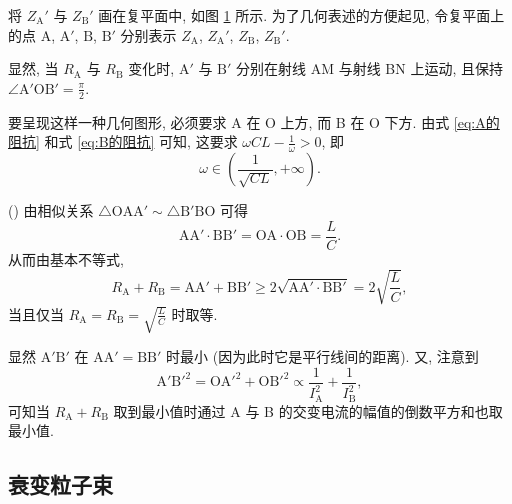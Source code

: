 \documentclass{article}
\newcounter{para}
\newcommand\mypara{\par\refstepcounter{para}(\thepara)\space}
\begin{document}
将 $Z_\mathrm A'$ 与 $Z_\mathrm B'$ 画在复平面中, 如图 \ref{fig:阻抗复平面} 所示.
为了几何表述的方便起见,
令复平面上的点 $\mathrm A$, $\mathrm A'$, $\mathrm B$, $\mathrm B'$
分别表示 $Z_\mathrm A$, $Z_\mathrm A'$, $Z_\mathrm B$, $Z_\mathrm B'$.

\begin{figure}[h!]
	\centering
	\caption{}
	\label{fig:阻抗复平面}
\end{figure}

显然, 当 $R_\mathrm A$ 与 $R_\mathrm B$ 变化时,
$\mathrm A'$ 与 $\mathrm B'$ 分别在射线 AM 与射线 BN 上运动,
且保持 $\angle\mathrm{A'OB'}=\frac\pi2$.

要呈现这样一种几何图形, 必须要求 A 在 O 上方, 而 B 在 O 下方.
由式 \ref{eq:A的阻抗} 和式 \ref{eq:B的阻抗} 可知, 这要求 $\omega CL-\frac1\omega>0$, 即
\begin{equation}
	\omega\in\left(\frac1{\sqrt{CL}},+\infty\right).
\end{equation}

\mypara
由相似关系 $\triangle\mathrm{OAA'}\sim\triangle\mathrm{B'BO}$ 可得
\begin{equation}
	\mathrm{AA'}\cdot\mathrm{BB'}=\mathrm{OA}\cdot\mathrm{OB}=\frac LC.
\end{equation}
从而由基本不等式,
\begin{equation}
	R_\mathrm A+R_\mathrm B=\mathrm{AA'}+\mathrm{BB'}\ge2\sqrt{\mathrm{AA'}\cdot\mathrm{BB'}}=2\sqrt{\frac LC},
\end{equation}
当且仅当 $R_\mathrm A=R_\mathrm B=\sqrt{\frac LC}$ 时取等.

显然 $\mathrm{A'B'}$ 在 $\mathrm{AA'}=\mathrm{BB'}$ 时最小 (因为此时它是平行线间的距离).
又, 注意到
\begin{equation}
	\mathrm{A'B'}^2=\mathrm{OA'}^2+\mathrm{OB'}^2\propto\frac1{I_\mathrm A^2}+\frac1{I_\mathrm B^2},
\end{equation}
可知当 $R_\mathrm A+R_\mathrm B$ 取到最小值时通过 A 与 B 的交变电流的幅值的倒数平方和也取最小值.

\subsection{衰变粒子束}
\end{document}
